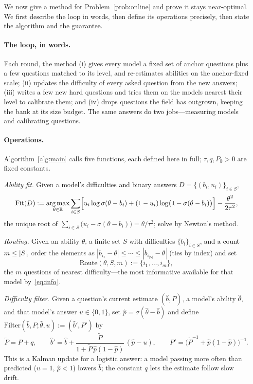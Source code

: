 \documentclass[11pt]{article}
\newcommand{\sigm}{\sigma}
\newcommand{\R}{\mathbb{R}}
\newcommand{\Fit}{\mathrm{Fit}}
\newcommand{\Route}{\mathrm{Route}}
\newcommand{\Filter}{\mathrm{Filter}}
\DeclareMathOperator*{\argmax}{arg\,max}
\theoremstyle{plain}
\theoremstyle{definition}
\theoremstyle{remark}
\begin{document}
We now give a method for Problem~\ref{prob:online} and prove it stays near-optimal.
We first describe the loop in words, then define its operations precisely, then
state the algorithm and the guarantee.

\paragraph{The loop, in words.} Each round, the method (i) gives every model a fixed
set of anchor questions plus a few questions matched to its level, and re-estimates
abilities on the anchor-fixed scale; (ii) updates the difficulty of every asked
question from the new answers; (iii) writes a few new hard questions and tries them
on the models nearest their level to calibrate them; and (iv) drops questions the
field has outgrown, keeping the bank at its size budget. The same answers do two
jobs---measuring models and calibrating questions.

\paragraph{Operations.} Algorithm~\ref{alg:main} calls five functions, each defined
here in full; $\tau,q,P_0>0$ are fixed constants.

\textit{Ability fit.} Given a model's difficulties and binary answers
$D=\{(b_i,u_i)\}_{i\in S}$,
\begin{equation}
\Fit(D):=\argmax_{\theta\in\R}\sum_{i\in S}\Bigl[u_i\log\sigm(\theta-b_i)
+(1-u_i)\log\bigl(1-\sigm(\theta-b_i)\bigr)\Bigr]-\frac{\theta^2}{2\tau^2},
\label{eq:fitop}
\end{equation}
the unique root of $\sum_{i\in S}\bigl(u_i-\sigm(\theta-b_i)\bigr)=\theta/\tau^2$;
solve by Newton's method.

\textit{Routing.} Given an ability $\theta$, a finite set $S$ with difficulties
$\{b_i\}_{i\in S}$, and a count $m\le|S|$, order the elements as
$|b_{i_1}-\theta|\le\cdots\le|b_{i_{|S|}}-\theta|$ (ties by index) and set
\begin{equation}
\Route(\theta,S,m):=\{i_1,\dots,i_m\},
\label{eq:route}
\end{equation}
the $m$ questions of nearest difficulty---the most informative available for that
model by~\eqref{eq:info}.

\textit{Difficulty filter.} Given a question's current estimate $(\hat b,P)$, a
model's ability $\hat\theta$, and that model's answer $u\in\{0,1\}$, set
$\hat p=\sigm(\hat\theta-\hat b)$ and define
$\Filter(\hat b,P;\hat\theta,u):=(\hat b',P')$ by
\begin{equation}
\tilde P=P+q,\qquad
\hat b'=\hat b+\frac{\tilde P}{1+\tilde P\,\hat p(1-\hat p)}\,(\hat p-u),\qquad
P'=\bigl(\tilde P^{-1}+\hat p(1-\hat p)\bigr)^{-1}.
\label{eq:filter}
\end{equation}
This is a Kalman update for a logistic answer: a model passing more often than
predicted ($u=1$, $\hat p<1$) lowers $\hat b$; the constant $q$ lets the estimate
follow slow drift.
\end{document}
